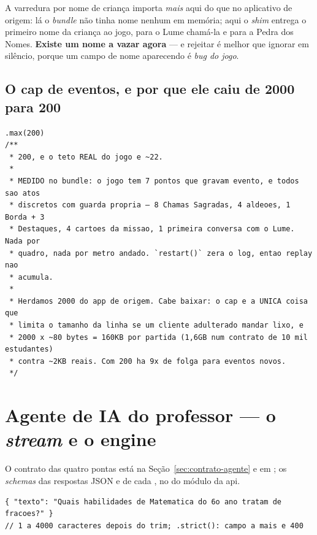 \begin{nota}
A varredura por nome de criança importa \emph{mais} aqui do que no aplicativo de
origem: lá o \emph{bundle} não tinha nome nenhum em memória; aqui o \emph{shim}
entrega o primeiro nome da criança ao jogo, para o Lume chamá-la e para a Pedra
dos Nomes. \textbf{Existe um nome a vazar agora} --- e rejeitar é melhor que
ignorar em silêncio, porque um campo de nome aparecendo é \emph{bug do jogo}.
\end{nota}

\subsection{O cap de eventos, e por que ele caiu de 2000 para 200}

\begin{lstlisting}[language=tsunoo]
.max(200)
/**
 * 200, e o teto REAL do jogo e ~22.
 *
 * MEDIDO no bundle: o jogo tem 7 pontos que gravam evento, e todos sao atos
 * discretos com guarda propria — 8 Chamas Sagradas, 4 aldeoes, 1 Borda + 3
 * Destaques, 4 cartoes da missao, 1 primeira conversa com o Lume. Nada por
 * quadro, nada por metro andado. `restart()` zera o log, entao replay nao
 * acumula.
 *
 * Herdamos 2000 do app de origem. Cabe baixar: o cap e a UNICA coisa que
 * limita o tamanho da linha se um cliente adulterado mandar lixo, e
 * 2000 x ~80 bytes = 160KB por partida (1,6GB num contrato de 10 mil estudantes)
 * contra ~2KB reais. Com 200 ha 9x de folga para eventos novos.
 */
\end{lstlisting}

\section{Agente de IA do professor --- o \emph{stream} e o engine}
\label{sec:payload-agente}

O contrato das quatro pontas está na Seção~\ref{sec:contrato-agente} e em
; os \emph{schemas} das respostas JSON
e de cada , no  do módulo
 da api.

\begin{lstlisting}[language=jsonunoo, caption={\rota{POST /agente-professor/conversas/:id/mensagens} --- corpo}]
{ "texto": "Quais habilidades de Matematica do 6o ano tratam de fracoes?" }
// 1 a 4000 caracteres depois do trim; .strict(): campo a mais e 400
\end{lstlisting}

